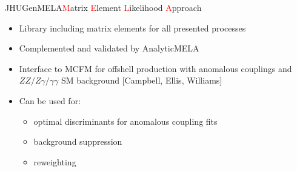 \documentclass[usenames,dvipsnames,svgnames,table]{beamer}
\begin{document}
\begin{frame}{JHUGenMELA}{\textcolor{red}{M}atrix \textcolor{red}{E}lement \textcolor{red}{L}ikelihood \textcolor{red}{A}pproach}
\begin{itemize}
\item Library including matrix elements for all presented processes
\begin{multicols}{3}
\end{multicols}
\item Complemented and validated by AnalyticMELA
\item Interface to MCFM for offshell production with anomalous couplings and $ZZ/Z\gamma/\gamma\gamma$ SM background \tiny [Campbell, Ellis, Williams] \normalsize
\item Can be used for:
\begin{itemize}
\item optimal discriminants for anomalous coupling fits
\item background suppression
\item reweighting
\end{itemize}
\end{itemize}
\end{frame}
\end{document}
